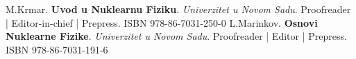 \begin{scholarship}
                    {M.Krmar. \textbf{Uvod u Nuklearnu Fiziku}. \textit{Univerzitet u Novom Sadu}.  Proofreader | Editor-in-chief | Prepress. ISBN 978-86-7031-250-0}
                    {L.Marinkov. \textbf{Osnovi Nuklearne Fizike}. \textit{Univerzitet u Novom Sadu}. Proofreader | Editor | Prepress. ISBN 978-86-7031-191-6}
                    
  \emptySeparator                    
\end{scholarship}